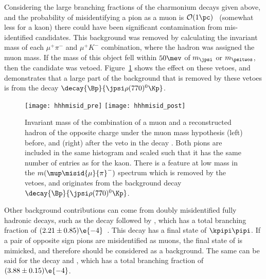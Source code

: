 Considering the large branching fractions of the charmonium decays given above, and the probability of
misidentifying a pion as a muon is $\mathcal{O}(1\pc)$~\cite{LHCb-DP-2013-001} (somewhat less for a
kaon) there could have been significant contamination from mis-identified candidates.
This background was removed by calculating the invariant mass of each $\mu^+\pi^-$ and
$\mu^+K^-$ combination, where the hadron was assigned the muon mass.
If the mass of this object fell within $50\mev$ of $m_\jpsi$ or $m_\psitwos$, then the candidate
was vetoed.
Figure~\ref{fig:hhh:misid} shows the effect on these vetoes, and demonstrates that a large part
of the background that is removed by these vetoes is from the decay
$\decay{\Bp}{\jpsi\rho(770)^0\Kp}$.


\begin{figure}
  \begin{center}
    \texttt{[image: hhhmisid\_pre]}
    \texttt{[image: hhhmisid\_post]}
    \caption[Backgrounds from misidentified charmonia]
    {\small
      Invariant mass of the combination of a muon and a reconstructed hadron of the opposite charge
      under the muon mass hypothesis (left) before, and (right) after the veto in the decay
      \btokpipimumu.
      Both pions are included in the same histogram and scaled such that it has the same number of
      entries as for the kaon.
      There is a feature at low mass in the $m(\mup\misid{\mu}{\pi}^-)$ spectrum which is removed by the
      vetoes, and originates from the background decay $\decay{\Bp}{\jpsi\rho(770)^0\Kp}$.
    }
    \label{fig:hhh:misid}
  \end{center}
\end{figure}


Other background contributions can come from doubly misidentified fully hadronic decays, such as
the decay \decay{\Bd}{\Dzb\pip\pipi} followed by \decay{\Dzb}{\kpi}, which
has a total branching fraction of $(2.21\pm0.85)\e{-4}$~\cite{PDG2012}.
This decay has a final state of $\kpipi\pipi$.
If a pair of opposite sign pions are misidentified
as muons, the final state of \kpipimumu is mimicked, and therefore should be considered as a
background.
The same can be said for the decay \decay{\Bd}{\Dzb\pip} and \decay{\Dzb}{\Km\pip\pipi},
which has a total branching fraction of $(3.88\pm0.15)\e{-4}$.

